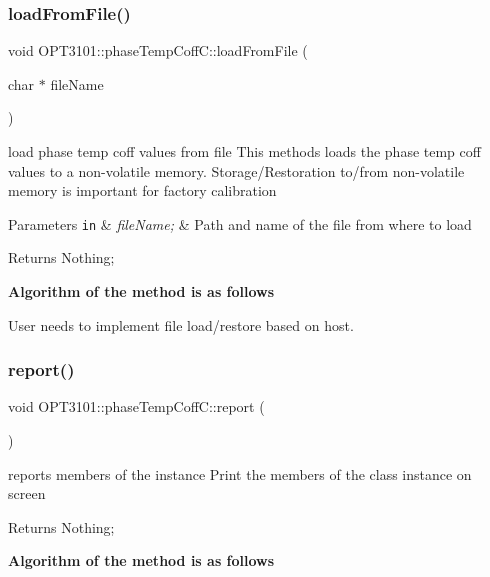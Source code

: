 \subsubsection{\texorpdfstring{load\+From\+File()}{loadFromFile()}}
{\footnotesize\ttfamily void O\+P\+T3101\+::phase\+Temp\+Coff\+C\+::load\+From\+File (\begin{DoxyParamCaption}\item[{char $\ast$}]{file\+Name }\end{DoxyParamCaption})}



load phase temp coff values from file This methods loads the phase temp coff values to a non-\/volatile memory. Storage/\+Restoration to/from non-\/volatile memory is important for factory calibration 


\begin{DoxyParams}[1]{Parameters}
\mbox{\tt in}  & {\em file\+Name;} & Path and name of the file from where to load \\
\hline
\end{DoxyParams}
\begin{DoxyReturn}{Returns}
Nothing; 
\end{DoxyReturn}
{\bfseries Algorithm of the method is as follows}


\begin{DoxyItemize}
\item User needs to implement file load/restore based on host. 
\end{DoxyItemize}\mbox{\label{class_o_p_t3101_1_1phase_temp_coff_c_af41bc218f81c9bfe8ae00e0bc6a64f4f}} 
\subsubsection{\texorpdfstring{report()}{report()}}
{\footnotesize\ttfamily void O\+P\+T3101\+::phase\+Temp\+Coff\+C\+::report (\begin{DoxyParamCaption}{ }\end{DoxyParamCaption})}



reports members of the instance Print the members of the class instance on screen 

\begin{DoxyReturn}{Returns}
Nothing; 
\end{DoxyReturn}
{\bfseries Algorithm of the method is as follows}


